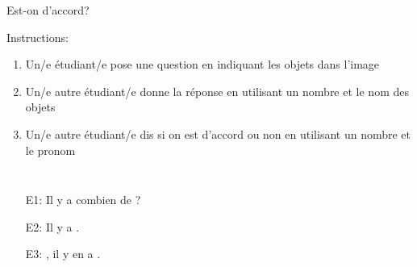 \begin{frame}{Est-on d'accord?}
  {}{\scriptsize
    Instructions:
    \begin{enumerate}
      \item<2-> Un/e étudiant/e pose une question en indiquant les objets dans l'image
      \item<3-> Un/e autre étudiant/e donne la réponse en utilisant un nombre et le nom des objets
      \item<4-> Un/e autre étudiant/e dis si on est d'accord ou non en utilisant un nombre et le pronom 
    \end{enumerate}
  }
  \begin{columns}
      \begin{itemize}
        \item[E1:] Il y a combien de \underline{}?
        \item[E2:] Il y a \underline{}.
        \item[E3:] \underline{}, il y en a \underline{}.
      \end{itemize}
      \begin{minipage}[c][0.6\textheight]{\linewidth}
        \begin{center}
        \end{center}
      \end{minipage}
  \end{columns}
\end{frame}